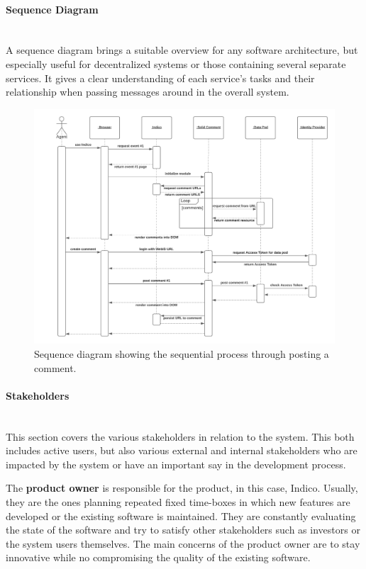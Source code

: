 \paragraph{Sequence Diagram}\mbox{}\\

A sequence diagram brings a suitable overview for any software architecture, but especially useful for decentralized systems or those containing several separate services. It gives a clear understanding of each service’s tasks and their relationship when passing messages around in the overall system.

\begin{figure}[H]
    \centering
    \includegraphics[width=\textwidth]{prototype/graphs/poc-comment-sequence_diagram.png}
    \caption{Sequence diagram showing the sequential process through posting a comment.}
    \label{fig:poc-comment-sequence_diagram}
\end{figure}
\vspace{0.5cm}
\paragraph{Stakeholders}\mbox{}\\

This section covers the various stakeholders in relation to the system. This both includes active users, but also various external and internal stakeholders who are impacted by the system or have an important say in the development process.

The \textbf{product owner} is responsible for the product, in this case, Indico. Usually, they are the ones planning repeated fixed time-boxes in which new features are developed or the existing software is maintained. They are constantly evaluating the state of the software and try to satisfy other stakeholders such as investors or the system users themselves. The main concerns of the product owner are to stay innovative while no compromising the quality of the existing software.


